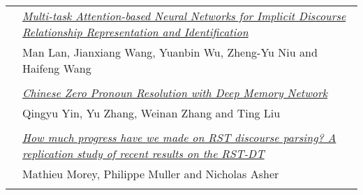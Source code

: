 \begin{tabular}{p{20mm}p{128mm}}
 & \hyperlink{page.1308}{\em Multi-task Attention-based Neural Networks for Implicit Discourse Relationship Representation and Identification}\\
         & Man Lan, Jianxiang Wang, Yuanbin Wu, Zheng-Yu Niu and Haifeng Wang \\
\\

 & \hyperlink{page.1318}{\em Chinese Zero Pronoun Resolution with Deep Memory Network}\\
         & Qingyu Yin, Yu Zhang, Weinan Zhang and Ting Liu \\
\\

 & \hyperlink{page.1328}{\em How much progress have we made on RST discourse parsing? A replication study of recent results on the RST-DT}\\
         & Mathieu Morey, Philippe Muller and Nicholas Asher \\
\\

\end{tabular}
\newpage
